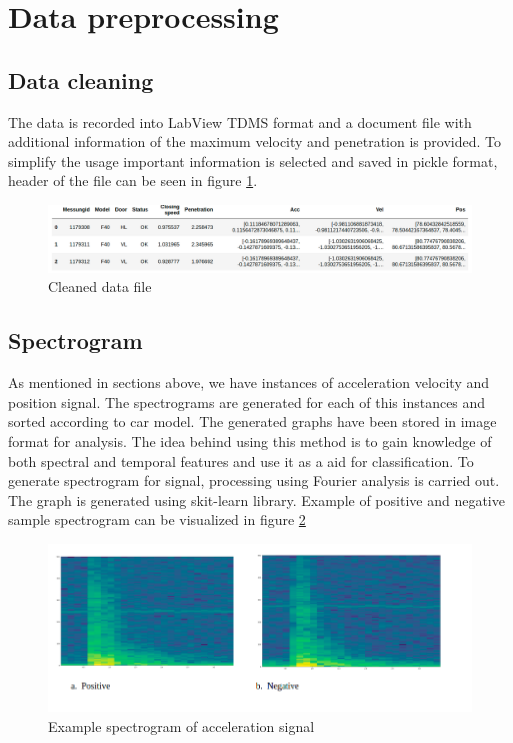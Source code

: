    \section{Data preprocessing}
    \subsection{Data cleaning}
    The data is recorded into LabView TDMS format and a document file with additional information of the maximum velocity and penetration is provided. To simplify the usage important information is selected and saved in pickle format, header of the file can be seen in figure \ref{n8}.
    
     \begin{figure}[h]
     	\centering
     	\includegraphics[width=1\linewidth]{images/pickle.png}
     	\caption{Cleaned data file}
     	\label{n8}
     \end{figure}
     
     
    \subsection{Spectrogram}
    As mentioned in sections above, we have instances of acceleration velocity and position signal. The spectrograms are generated for each of this instances and sorted according to car model. The generated graphs have been stored in image format for analysis. The idea behind using this method is to gain knowledge of both spectral and temporal features and use it as a aid for classification. 
    To generate spectrogram for signal, processing using Fourier analysis is carried out. The graph is generated using skit-learn library.
    Example of positive and negative sample spectrogram can be visualized in figure \ref{n9}
    
    \begin{figure}[h]
    	\centering
    	\includegraphics[width=1\linewidth]{images/spec1.png}
    	\caption{Example spectrogram of acceleration signal }
    	\label{n9}
    \end{figure}
  



